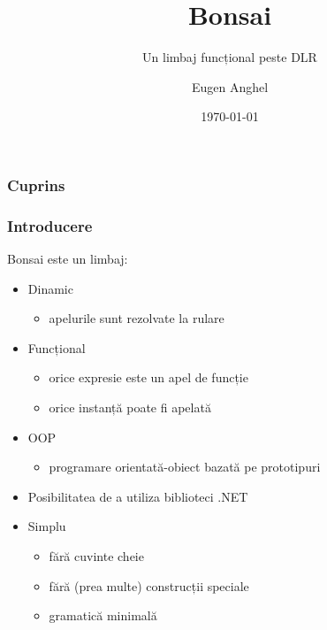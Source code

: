 \documentclass{beamer}
\title[Bonsai - un limbaj funcțional peste DLR]{Bonsai}
\subtitle{Un limbaj funcțional peste DLR}
\author{Eugen Anghel}
\institute{Coordonator științific\\Profesor Doctor Gheorghe Grigoraș}
\date{\today}
\begin{document}
\frame{\titlepage}

\begin{frame}
  \frametitle{Cuprins}
  \tableofcontents
\end{frame}

\begin{frame}
  \frametitle{Introducere}
  Bonsai este un limbaj:
  \begin{itemize}
  \item 
    Dinamic
    \begin{itemize}
      \item apelurile sunt rezolvate la rulare
    \end{itemize}
  \item 
    Funcțional
    \begin{itemize}
    \item orice expresie este un apel de funcție
    \item orice instanță poate fi apelată
    \end{itemize}
  \item 
    OOP
    \begin{itemize}
    \item programare orientată-obiect bazată pe prototipuri
    \end{itemize}
  \item
    Posibilitatea de a utiliza biblioteci .NET
  \item
    Simplu
    \begin{itemize}
    \item fără cuvinte cheie
    \item fără (prea multe) construcții speciale
    \item gramatică minimală
    \end{itemize}
  \end{itemize}
\end{frame}
\end{document}
